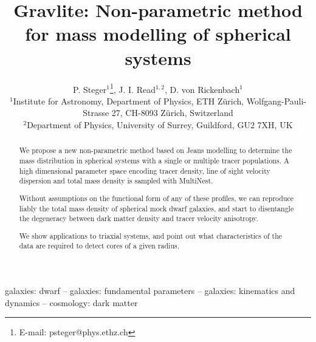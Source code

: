 \documentclass[useAMS,usenatbib]{mn2e}
\title[{\sc Gravlite}: Non-parametric spherical mass modelling]{{\sc Gravlite}: Non-parametric method for mass modelling of spherical systems}
\author[Steger]{P. Steger$^1$\thanks{E-mail: psteger@phys.ethz.ch}, J. I. Read$^{1,2}$, D. von Rickenbach$^1$\\
$^1$Institute for Astronomy, Department of Physics, ETH Z\"urich, Wolfgang-Pauli-Strasse 27, CH-8093 Z\"urich, Switzerland\\
$^2$Department of Physics, University of Surrey, Guildford, GU2 7XH, UK
}
\begin{document}
\maketitle

\begin{abstract}
    We propose a new non-parametric method based on Jeans modelling to
    determine the mass distribution in spherical systems with a single
    or multiple tracer populations. A high dimensional parameter space
    encoding tracer density, line of sight velocity dispersion and
    total mass density is sampled with MultiNest.

    Without assumptions on the functional form of any of these
    profiles, we can reproduce liably the total mass density of
    spherical mock dwarf galaxies, and start to disentangle the
    degeneracy between dark matter density and tracer velocity
    anisotropy.

    We show applications to triaxial systems, and point out what
    characteristics of the data are required to detect cores of a
    given radius.
\end{abstract}

\begin{keywords} galaxies: dwarf -- galaxies: fundamental parameters
    -- galaxies: kinematics and dynamics -- cosmology: dark matter
\end{keywords}










%
\end{document}

